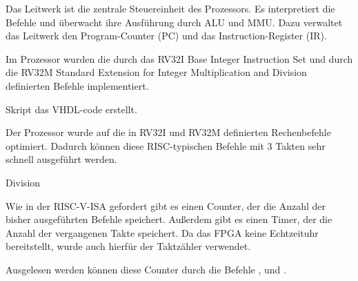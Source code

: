 Das Leitwerk ist die zentrale Steuereinheit des Prozessors. Es interpretiert
die Befehle und \"uberwacht ihre Ausf\"uhrung durch ALU und MMU. Dazu verwaltet
das Leitwerk den Program-Counter (PC) und das Instruction-Register (IR).

Im Prozessor wurden die durch das RV32I Base Integer Instruction Set
und durch die RV32M Standard Extension for Integer Multiplication and Division
definierten Befehle implementiert.

Skript das VHDL-code erstellt.





Der Prozessor wurde auf die in RV32I und RV32M definierten Rechenbefehle
optimiert. Dadurch k\"onnen diese RISC-typischen Befehle mit 3 Takten sehr
schnell ausgef\"uhrt werden.

Division

Wie in der RISC-V-ISA gefordert gibt es einen Counter, der die Anzahl der
bisher ausgef\"uhrten Befehle speichert. Au\ss{}erdem gibt es einen Timer, der
die Anzahl der vergangenen Takte speichert. Da das FPGA keine Echtzeituhr
bereitstellt, wurde auch hierf\"ur der Taktz\"ahler verwendet.

Ausgelesen werden k\"onnen diese Counter durch die Befehle \nolinebreak{},
 und .

